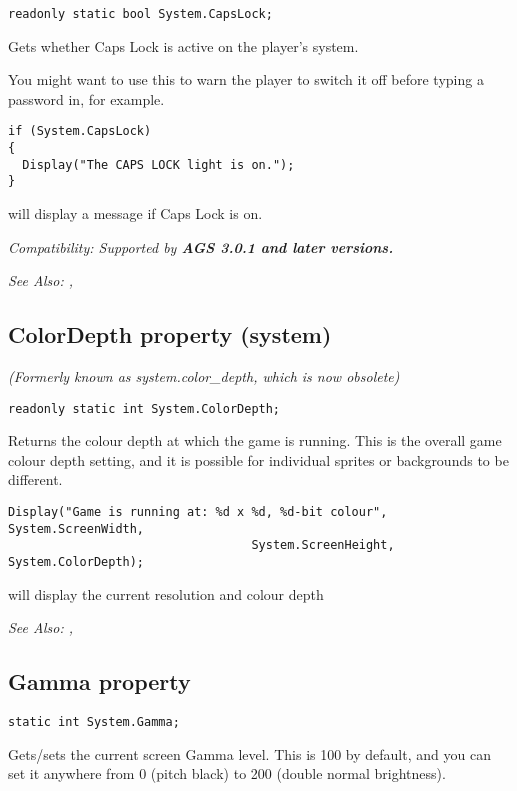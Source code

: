 \begin{verbatim}
readonly static bool System.CapsLock;
\end{verbatim}
Gets whether Caps Lock is active on the player's system.

You might want to use this to warn the player to switch it off before typing
a password in, for example.

\begin{verbatim}
if (System.CapsLock)
{
  Display("The CAPS LOCK light is on.");
}
\end{verbatim}
will display a message if Caps Lock is on.

\it{Compatibility:} Supported by \bf{AGS 3.0.1} and later versions.

\it{See Also:} ,


\subsection{ColorDepth property (system)}\label{System.ColorDepth}%

\it{(Formerly known as system.color_depth, which is now obsolete)}

\begin{verbatim}
readonly static int System.ColorDepth;
\end{verbatim}
Returns the colour depth at which the game is running. This is the overall game colour depth setting,
and it is possible for individual sprites or backgrounds to be different.

\begin{verbatim}
Display("Game is running at: %d x %d, %d-bit colour", System.ScreenWidth,
                                  System.ScreenHeight, System.ColorDepth);
\end{verbatim}
will display the current resolution and colour depth

\it{See Also:} ,


\subsection{Gamma property}\label{System.Gamma}%

\begin{verbatim}
static int System.Gamma;
\end{verbatim}
Gets/sets the current screen Gamma level. This is 100 by default, and you can set it anywhere from 0 (pitch black)
to 200 (double normal brightness).

